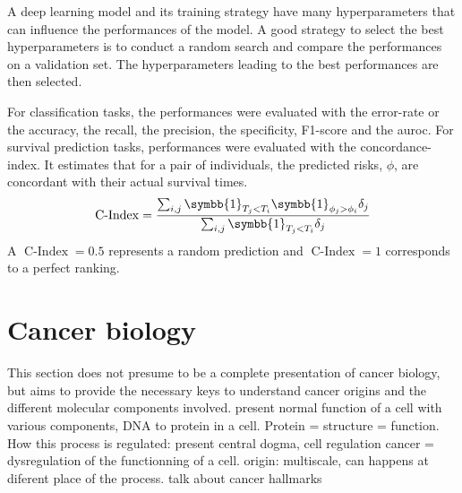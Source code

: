 \documentclass[../main.tex]{subfiles}
\begin{document}
     A deep learning model and its training strategy have many hyperparameters that can influence the performances of the model.
     A good strategy to select the best hyperparameters is to conduct a random search and compare the performances on a validation set.
     The hyperparameters leading to the best performances are then selected.

     For classification tasks, the performances were evaluated with the error-rate or the accuracy, the recall, the precision, the specificity, F1-score and the \gls{auroc}.
     For survival prediction tasks, performances were evaluated with the concordance-index.
     It estimates that for a pair of individuals, the predicted risks, \(\phi\),  are concordant with their actual survival times.
     \begin{equation}
         \operatorname{C-Index} = \frac{\sum_{i,j}\symbb{1}_{T_j < T_i}\symbb{1}_{\phi_j > \phi_i}\delta_j}{\sum_{i,j}\symbb{1}_{T_j < T_i}\delta_j}
     \end{equation}
     A \(\operatorname{C-Index} = 0.5\) represents a random prediction and \(\operatorname{C-Index} = 1\) corresponds to a perfect ranking.

\section{Cancer biology}
 This section does not presume to be a complete presentation of cancer biology, but aims to provide the necessary keys to understand cancer origins and the different molecular components involved.
 present normal function of a cell with various components, DNA to protein in a cell. Protein = structure = function.
 How this process is regulated: present central dogma, cell regulation
 cancer = dysregulation of the functionning of a cell.
 origin: multiscale, can happens at diferent place of the process.
 talk about cancer hallmarks
\end{document}
